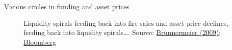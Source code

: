 

\begin{frame}{Vicious circles in funding and asset prices}

\begin{figure}
\begin{center}


\caption{\label{fig:L4_liquidity_spiral} Liquidity spirals feeding back into fire sales and asset price declines, feeding back into liquidity spirals\ldots. Source: \href{https://www.princeton.edu/~markus/research/papers/liquidity_credit_crunch.pdf}{Brunnermeier (2009); Bloomberg}}

\end{center}
\end{figure}

\end{frame}

